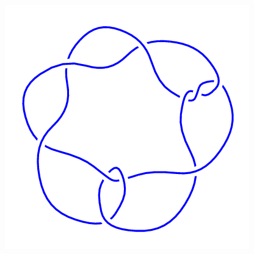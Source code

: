 \begin{figure}[H]
\begin{minipage}[b]{.18\linewidth}
	\end{minipage}
	\begin{minipage}[b]{.18\linewidth}
		\centering
		\includegraphics[width=\linewidth]{../data/10_21.png}
	\end{minipage}
\end{figure}
